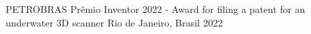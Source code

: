 



\begin{cvhonors}

  \cvhonor
    {PETROBRAS} %
    {Prêmio Inventor 2022 - Award for filing a patent for an underwater 3D scanner} %
    {Rio de Janeiro, Brasil} %
    {2022} %


\end{cvhonors}







